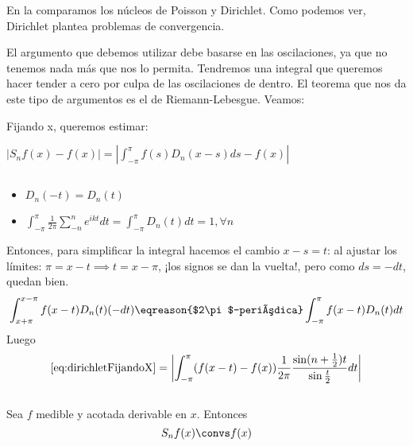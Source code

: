 	En la  comparamos los núcleos de Poisson y Dirichlet. Como podemos ver, Dirichlet plantea problemas de convergencia.

	El argumento que debemos utilizar debe basarse en las oscilaciones, ya que no tenemos nada más que nos lo permita. Tendremos una integral que queremos hacer tender a cero por culpa de las oscilaciones de dentro. El teorema que nos da este tipo de argumentos es el de Riemann-Lebesgue. Veamos:

	Fijando x, queremos estimar:

	\( |S_n f(x) - f(x) | = \left| \int_{-\pi}^\pi f(s) D_n (x-s) ds - f(x) \right| \label{eq:dirichletFijandoX} \)

	\newpage %
	\begin{prop}
	$ $ %

	\begin{itemize}
		\item $D_n(-t) = D_n(t)$
		\item $\displaystyle \int_{-\pi}^\pi  \frac{1}{2\pi} \sum_{-n}^{n} e^{ikt} dt = \int_{-\pi}^{\pi} D_n(t) dt = 1, \forall n $
	\end{itemize}
	\end{prop}


	Entonces, para simplificar la integral hacemos el cambio $x-s = t$:
	\obs al ajustar los límites: $\pi = x-t \implies t = x-\pi$, ¡los signos se dan la vuelta!, pero como $ds = - dt$, quedan bien.
	\[  \int_{x+\pi}^{x -\pi} f(x-t) D_n(t) (-dt) \eqreason{$2\pi$-periódica} \int^{\pi}_{-\pi} f(x-t) D_n(t) dt \]
	Luego
	\[ \eqref{eq:dirichletFijandoX} = \left| \int_{-\pi}^\pi (f(x-t)-f(x)) \frac{1}{2\pi} \frac{\sin(n+\frac{1}{2})t}{\sin{\frac{t}{2}}} dt \right| \]


	\begin{theorem} \label{thm:Dirichlet1}
		$ $ %

		Sea $f$ medible y acotada derivable en $x$. Entonces $$S_n f(x) \convs f(x)$$
	\end{theorem}

